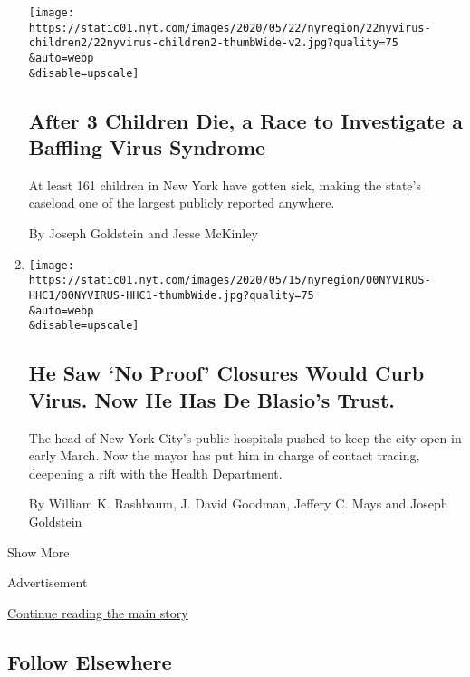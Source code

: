 \begin{enumerate}
  \texttt{[image: https://static01.nyt.com/images/2020/05/22/nyregion/22nyvirus-children2/22nyvirus-children2-thumbWide-v2.jpg?quality=75\\\&auto=webp\\\&disable=upscale]}

  \hypertarget{after-3-children-die-a-race-to-investigate-a-baffling-virus-syndrome}{%
  \subsection{After 3 Children Die, a Race to Investigate a Baffling
  Virus
  Syndrome}\label{after-3-children-die-a-race-to-investigate-a-baffling-virus-syndrome}}

  At least 161 children in New York have gotten sick, making the state's
  caseload one of the largest publicly reported anywhere.

  By Joseph Goldstein and Jesse McKinley
\item
  \href{/2020/05/14/nyregion/coronavirus-de-blasio-mitchell-katz.html}{}

  \texttt{[image: https://static01.nyt.com/images/2020/05/15/nyregion/00NYVIRUS-HHC1/00NYVIRUS-HHC1-thumbWide.jpg?quality=75\\\&auto=webp\\\&disable=upscale]}

  \hypertarget{he-saw-no-proof-closures-would-curb-virus-now-he-has-de-blasios-trust}{%
  \subsection{He Saw `No Proof' Closures Would Curb Virus. Now He Has De
  Blasio's
  Trust.}\label{he-saw-no-proof-closures-would-curb-virus-now-he-has-de-blasios-trust}}

  The head of New York City's public hospitals pushed to keep the city
  open in early March. Now the mayor has put him in charge of contact
  tracing, deepening a rift with the Health Department.

  By William K. Rashbaum, J. David Goodman, Jeffery C. Mays and Joseph
  Goldstein
\end{enumerate}

Show More

Advertisement

\protect\hyperlink{after-mid2}{Continue reading the main story}

\hypertarget{follow-elsewhere}{%
\subsection{Follow Elsewhere}\label{follow-elsewhere}}

